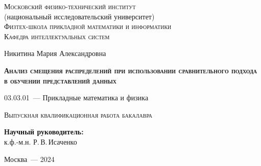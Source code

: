 \thispagestyle{empty}

\begin{titlepage}
    \begin{center}
        \textsc{Московский физико-технический институт}\\
        (национальный исследовательский университет)\\
        \textsc{Физтех-школа прикладной математики и информатики}\\
        \textsc{Кафедра интеллектуальных систем}
        \end{center}
        \vspace{1.5cm}
        \begin{center}
        {Никитина Мария Александровна}
        \par
        \vspace{2cm}
        {\Large \textsc{\textbf{Анализ смещения распределений при использовании сравнительного подхода в обучении представлений данных}}}
        \par
        \vspace{2cm}
        {03.03.01~--- Прикладные математика и физика}
        \par
        \vspace{1.5cm}
        \textsc{Выпускная квалификационная работа бакалавра}
        \end{center}
        \vspace{1.5cm}
        \hfill\parbox{8,4cm}{\textbf{Научный руководитель:}
        \\к.ф.-м.н. Р.\,В.\,Исаченко}
        \par
        \vspace{2.5cm}
        \begin{center}
        {Москва~--- 2024}
    \end{center}
\end{titlepage}